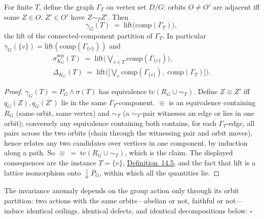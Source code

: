 \begin{thmplain}

For finite \(T\), define the graph \(\Gamma_T\) on vertex set \(D/G\): orbits \(O \ne O'\) are adjacent iff some \(Z \in O\), \(Z' \in O'\) have \(Z \sim_T Z'\). Then
\[
\gamma_G(T) \;=\; \mathrm{lift}\big(\mathrm{comp}(\Gamma_T)\big),
\]
the lift of the connected-component partition of \(\Gamma_T\). In particular \(\gamma_G(\{v\}) = \mathrm{lift}(\mathrm{comp}(\Gamma_{\{v\}}))\) and
\[\begin{gathered}\sigma^{\mathrm{sep}}_{K_G}(T) \;=\; \mathrm{lift}\Big(\bigvee_{v \in T} \mathrm{comp}(\Gamma_{\{v\}})\Big), \\ \Delta_{K_G}(T) \;=\; \mathrm{lift}\Big(\Big[\bigvee_{v} \mathrm{comp}(\Gamma_{\{v\}}),\; \mathrm{comp}(\Gamma_T)\Big]\Big).\end{gathered}\]
\end{thmplain}

\begin{proof}

\(\gamma_G(T) = P_G \wedge \sigma(T)\) has equivalence \(\mathrm{tc}(R_G \cup {\sim_T})\). Define \(Z \equiv Z'\) iff \(q_G(Z), q_G(Z')\) lie in the same \(\Gamma_T\)-component. \(\equiv\) is an equivalence containing \(R_G\) (same orbit, same vertex) and \(\sim_T\) (a \(\sim_T\)-pair witnesses an edge or lies in one orbit); conversely any equivalence containing both contains, for each \(\Gamma_T\)-edge, all pairs across the two orbits (chain through the witnessing pair and orbit moves), hence relates any two candidates over vertices in one component, by induction along a path. So \(\equiv \; = \; \mathrm{tc}(R_G \cup \sim_T)\), which is the claim. The displayed consequences are the instance \(T = \{v\}\), \hyperlink{stmt:14.5}{Definition~14.5}, and the fact that \(\mathrm{lift}\) is a lattice isomorphism onto \({\downarrow}P_G\), within which all the quantities lie.
\end{proof}

\begin{thmplain}

The invariance anomaly depends on the group action only through its orbit partition: two actions with the same orbits---\hspace{0pt}abelian or not, faithful or not---\hspace{0pt}induce identical ceilings, identical defects, and identical decompositions below. \(\square\)
\end{thmplain}


